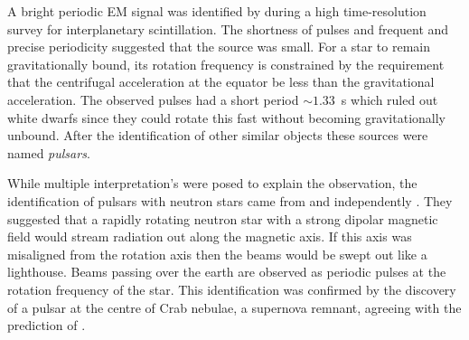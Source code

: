 A bright periodic EM signal was identified by \citet{Hewish1968} during a high
time-resolution survey for interplanetary scintillation. The shortness of
pulses and frequent and precise periodicity suggested that the source was
small. For a star to remain gravitationally bound, its rotation frequency is
constrained by the requirement that the centrifugal acceleration at the equator
be less than the gravitational acceleration. The observed pulses had a short
period $\sim 1.33$~s which ruled out white dwarfs since they could rotate this
fast without becoming gravitationally unbound. After the identification of
other similar objects these sources were named \emph{pulsars}. 

While multiple interpretation's were posed to explain the observation, the
identification of pulsars with neutron stars came from \citet{Pacini1967} and
independently \citet{Gold1968}. They suggested that a rapidly rotating neutron
star with a strong dipolar magnetic field would stream radiation out along the
magnetic axis. If this axis was misaligned from the rotation axis then the
beams would be swept out like a lighthouse. Beams passing over the earth are
observed as periodic pulses at the rotation frequency of the star.  This
identification was confirmed by the discovery of a pulsar at the centre of Crab
nebulae, a supernova remnant, agreeing with the prediction of \citet{Baade1934}.


